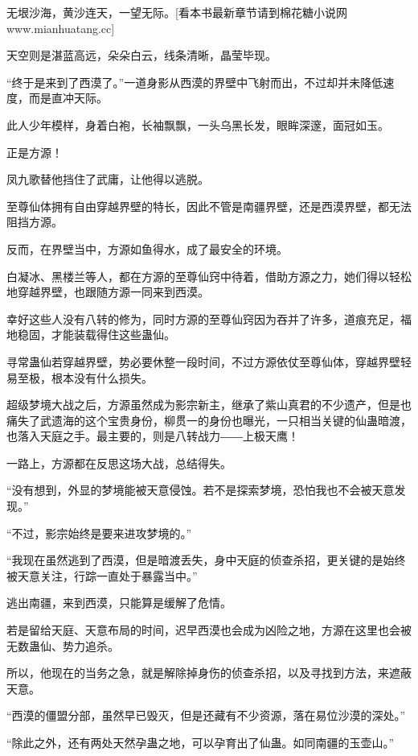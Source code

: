 
\begin{this_body}

无垠沙海，黄沙连天，一望无际。[看本书最新章节请到棉花糖小说网www.mianhuatang.cc]

天空则是湛蓝高远，朵朵白云，线条清晰，晶莹毕现。

“终于是来到了西漠了。”一道身影从西漠的界壁中飞射而出，不过却并未降低速度，而是直冲天际。

此人少年模样，身着白袍，长袖飘飘，一头乌黑长发，眼眸深邃，面冠如玉。

正是方源！

凤九歌替他挡住了武庸，让他得以逃脱。

至尊仙体拥有自由穿越界壁的特长，因此不管是南疆界壁，还是西漠界壁，都无法阻挡方源。

反而，在界壁当中，方源如鱼得水，成了最安全的环境。

白凝冰、黑楼兰等人，都在方源的至尊仙窍中待着，借助方源之力，她们得以轻松地穿越界壁，也跟随方源一同来到西漠。

幸好这些人没有八转的修为，同时方源的至尊仙窍因为吞并了许多，道痕充足，福地稳固，才能装载得住这些蛊仙。

寻常蛊仙若穿越界壁，势必要休整一段时间，不过方源依仗至尊仙体，穿越界壁轻易至极，根本没有什么损失。

超级梦境大战之后，方源虽然成为影宗新主，继承了紫山真君的不少遗产，但是也痛失了武遗海的这个宝贵身份，柳贯一的身份也曝光，一只相当关键的仙蛊暗渡，也落入天庭之手。最主要的，则是八转战力――上极天鹰！

一路上，方源都在反思这场大战，总结得失。

“没有想到，外显的梦境能被天意侵蚀。若不是探索梦境，恐怕我也不会被天意发现。”

“不过，影宗始终是要来进攻梦境的。”

“我现在虽然逃到了西漠，但是暗渡丢失，身中天庭的侦查杀招，更关键的是始终被天意关注，行踪一直处于暴露当中。”

逃出南疆，来到西漠，只能算是缓解了危情。

若是留给天庭、天意布局的时间，迟早西漠也会成为凶险之地，方源在这里也会被无数蛊仙、势力追杀。

所以，他现在的当务之急，就是解除掉身伤的侦查杀招，以及寻找到方法，来遮蔽天意。

“西漠的僵盟分部，虽然早已毁灭，但是还藏有不少资源，落在易位沙漠的深处。”

“除此之外，还有两处天然孕蛊之地，可以孕育出了仙蛊。如同南疆的玉壶山。”


\end{this_body}
